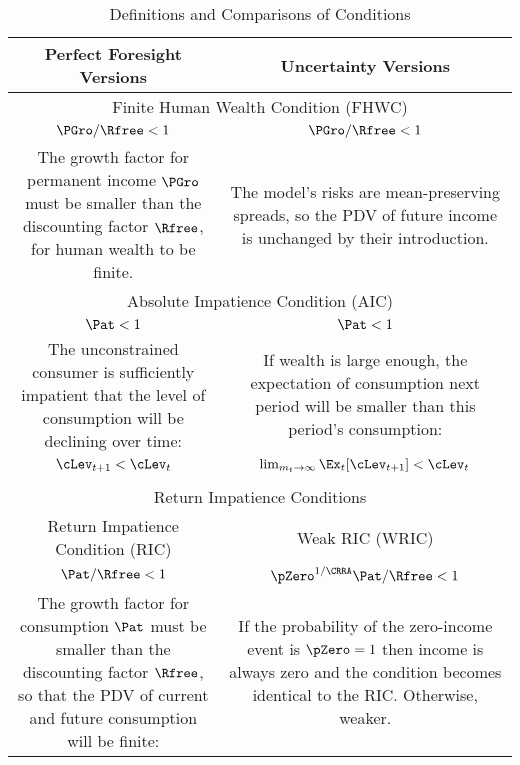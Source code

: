 \begin{table}[!th]
\caption{Definitions and Comparisons of Conditions}\label{table:Comparison}
\begin{center}
\begin{tabular}{|c|c|}\hline
Perfect Foresight Versions & Uncertainty Versions\\ \hline
\multicolumn{2}{|c|}{Finite Human Wealth Condition (FHWC)} \\ \hline
$\PGro/\Rfree < 1$                                                          & $\PGro/\Rfree < 1$ \\
\multirow{3}{75mm}{The growth factor for permanent income $\PGro$ must be smaller than the discounting factor $\Rfree$, for human wealth to be finite.} &
\multirow{3}{75mm}{The model's risks are mean-preserving spreads, so the PDV of future income is unchanged by their introduction.} \\
&  \\
&  \\ \hline
\multicolumn{2}{|c|}{Absolute Impatience Condition (AIC)} \\ \hline
$\Pat < 1$                                        &  $\Pat < 1$ \\
\multirow{4}{75mm}{The unconstrained consumer is sufficiently impatient that the level of consumption will be declining over time:} &
\multirow{4}{75mm}{If wealth is large enough, the expectation of consumption next period will be smaller than this period's consumption:} \\
& \\
& \\
& \\
$\cLev_{t+1} < \cLev_{t}$ & $\lim_{m_{t} \rightarrow \infty} \Ex_{t} [\cLev_{t+1}] < \cLev_{t}$ \\
& \\ \hline
\multicolumn{2}{|c|}{Return Impatience Conditions} \\ \hline
\multicolumn{1}{|c|}{Return Impatience Condition (RIC)} & \multicolumn{1}{c|}{Weak RIC (WRIC)} \\ \hline
$\Pat/\Rfree < 1$                                          & $\pZero^{1/\CRRA}\Pat/\Rfree < 1$ \\
\multirow{3}{75mm}{The growth factor for consumption $\Pat$ must be smaller than the discounting factor $\Rfree$, so that the PDV of current and future consumption will be finite:}  &
\multirow{3}{75mm}{If the probability of the zero-income event is $\pZero=1$ then income is always zero and the condition becomes identical to the RIC.  Otherwise, weaker.} \\

\end{tabular}
\end{center}
\end{table}
